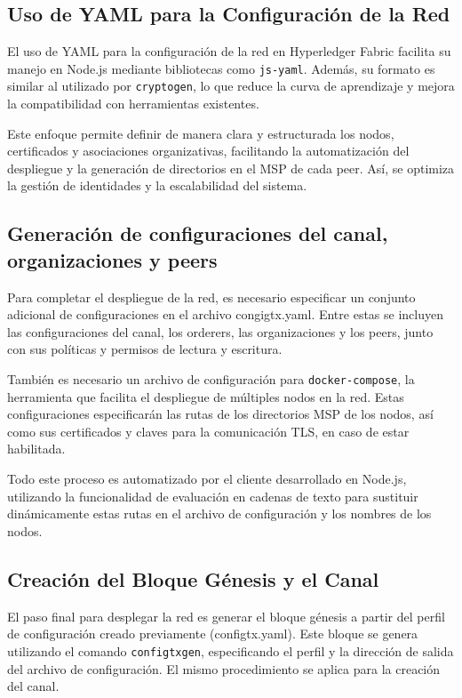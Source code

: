 \subsection{Uso de YAML para la Configuración de la Red}

El uso de YAML\cite{yaml} para la configuración de la red en Hyperledger Fabric facilita su manejo en Node.js\cite{nodejs} mediante bibliotecas como \texttt{js-yaml}. Además, su formato es similar al utilizado por \texttt{cryptogen}, lo que reduce la curva de aprendizaje y mejora la compatibilidad con herramientas existentes.

Este enfoque permite definir de manera clara y estructurada los nodos, certificados y asociaciones organizativas, facilitando la automatización del despliegue y la generación de directorios en el MSP de cada peer. Así, se optimiza la gestión de identidades y la escalabilidad del sistema.

\subsection{Generación de configuraciones del canal, organizaciones y peers}

Para completar el despliegue de la red, es necesario especificar un conjunto adicional de configuraciones en el archivo congigtx.yaml. Entre estas se incluyen las configuraciones del canal, los orderers, las organizaciones y los peers, junto con sus políticas y permisos de lectura y escritura.

También es necesario un archivo de configuración para \texttt{docker-compose}, la herramienta que facilita el despliegue de múltiples nodos en la red. Estas configuraciones especificarán las rutas de los directorios MSP de los nodos, así como sus certificados y claves para la comunicación TLS, en caso de estar habilitada.

Todo este proceso es automatizado por el cliente desarrollado en Node.js, utilizando la funcionalidad de evaluación en cadenas de texto para sustituir dinámicamente estas rutas en el archivo de configuración y los nombres de los nodos.
\subsection{Creación del Bloque Génesis y el Canal}

El paso final para desplegar la red es generar el bloque génesis a partir del perfil de configuración creado previamente (configtx.yaml). Este bloque se genera utilizando el comando \texttt{configtxgen}, especificando el perfil y la dirección de salida del archivo de configuración. El mismo procedimiento se aplica para la creación del canal.

